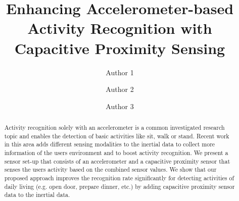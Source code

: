 \documentclass[runningheads,a4paper]{llncs}
\begin{document}
\mainmatter  %

\title{Enhancing Accelerometer-based Activity Recognition with Capacitive Proximity Sensing}


\author{Author 1 \and Author 2 \and Author 3 }





\maketitle
\begin{abstract}
Activity recognition solely with an accelerometer is a common investigated research topic and enables the detection of basic activities like sit, walk or stand. Recent work in this area adds different sensing modalities to the inertial data to collect more information of the users environment and to boost activity recognition.  We present a sensor set-up that consists of an accelerometer and a capacitive proximity sensor that senses the users activity based on the combined sensor values. We show that our proposed approach improves the recognition rate significantly for detecting activities of daily living (e.g. open door, prepare dinner, etc.) by adding capacitive proximity sensor data to the inertial data.
\end{abstract}
\end{document}
